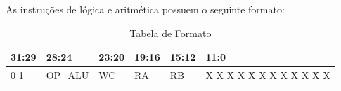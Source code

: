 \documentclass{report}
\begin{document}
As instruções de lógica e aritmética possuem o seguinte formato:
\FloatBarrier
\begin{table}[H]
    \begin{center}
    \renewcommand{\arraystretch}{1.5}
        \begin{tabular}[pos]{|>{\centering\arraybackslash}m{33pt}|>{\centering\arraybackslash}m{55pt}|>{\centering\arraybackslash}m{44pt}|>{\centering\arraybackslash}m{44pt}|>{\centering\arraybackslash}m{44pt}|>{\centering\arraybackslash}m{132pt}|} 
          \hline
          \cellcolor[gray]{0.9}\textbf{31:29} & \cellcolor[gray]{0.9}\textbf{28:24} & \cellcolor[gray]{0.9}\textbf{23:20} & \cellcolor[gray]{0.9}\textbf{19:16} & \cellcolor[gray]{0.9}\textbf{15:12} & \cellcolor[gray]{0.9}\textbf{11:0} \\ \hline
            0 0 1   & OP\_ALU    & WC    & RA    & RB    &   X X X X X X X X X X X X \\ \hline
        \end{tabular}
        \caption{Tabela de Formato}
    \end{center}
\end{table}  
\end{document}
